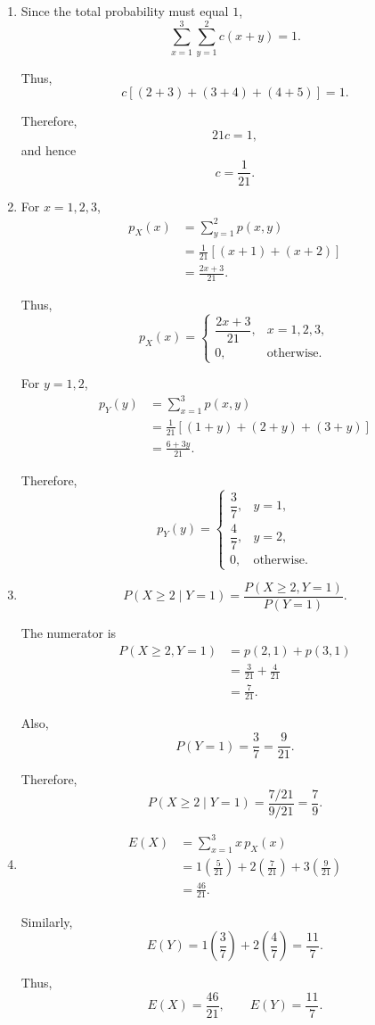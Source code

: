 \documentclass[11pt]{article}
\newenvironment{solution}{
    \par
    \begin{tcolorbox}[
        colback=white,
        colframe=uwgold,
        boxrule=0.7pt,
        arc=2mm,
        left=3mm,
        right=3mm,
        top=2mm,
        bottom=2mm,
        breakable,
        before skip=0.5em,
        after skip=1em,
        title=\textbf{Solution},
        coltitle=uwpurple,
        fonttitle=\bfseries
    ]
}{
    \end{tcolorbox}
}
\begin{document}
\begin{solution}

\begin{enumerate}[label=(\alph*)]

\item Since the total probability must equal \(1\),
\[
\sum_{x=1}^{3}\sum_{y=1}^{2}c(x+y)=1.
\]

Thus,
\[
c[(2+3)+(3+4)+(4+5)]=1.
\]

Therefore,
\[
21c=1,
\]
and hence
\[
c=\frac1{21}.
\]

\item For \(x=1,2,3\),
\[
\begin{aligned}
p_X(x)
&=
\sum_{y=1}^{2}p(x,y)\\
&=
\frac1{21}\left[(x+1)+(x+2)\right]\\
&=
\frac{2x+3}{21}.
\end{aligned}
\]

Thus,
\[
p_X(x)
=
\begin{cases}
\dfrac{2x+3}{21}, & x=1,2,3,\\[1mm]
0, & \text{otherwise}.
\end{cases}
\]

For \(y=1,2\),
\[
\begin{aligned}
p_Y(y)
&=
\sum_{x=1}^{3}p(x,y)\\
&=
\frac1{21}\left[(1+y)+(2+y)+(3+y)\right]\\
&=
\frac{6+3y}{21}.
\end{aligned}
\]

Therefore,
\[
p_Y(y)
=
\begin{cases}
\dfrac37, & y=1,\\[1mm]
\dfrac47, & y=2,\\[1mm]
0, & \text{otherwise}.
\end{cases}
\]

\item
\[
P(X\geq2\mid Y=1)
=
\frac{P(X\geq2,Y=1)}{P(Y=1)}.
\]

The numerator is
\[
\begin{aligned}
P(X\geq2,Y=1)
&=
p(2,1)+p(3,1)\\
&=
\frac3{21}+\frac4{21}\\
&=
\frac7{21}.
\end{aligned}
\]

Also,
\[
P(Y=1)=\frac37=\frac9{21}.
\]

Therefore,
\[
P(X\geq2\mid Y=1)
=
\frac{7/21}{9/21}
=
\frac79.
\]

\item
\[
\begin{aligned}
E(X)
&=
\sum_{x=1}^{3}x\,p_X(x)\\
&=
1\left(\frac5{21}\right)
+
2\left(\frac7{21}\right)
+
3\left(\frac9{21}\right)\\
&=
\frac{46}{21}.
\end{aligned}
\]

Similarly,
\[
E(Y)
=
1\left(\frac37\right)
+
2\left(\frac47\right)
=
\frac{11}{7}.
\]

Thus,
\[
E(X)=\frac{46}{21},
\qquad
E(Y)=\frac{11}{7}.
\]

\end{enumerate}

\end{solution}
\end{document}

